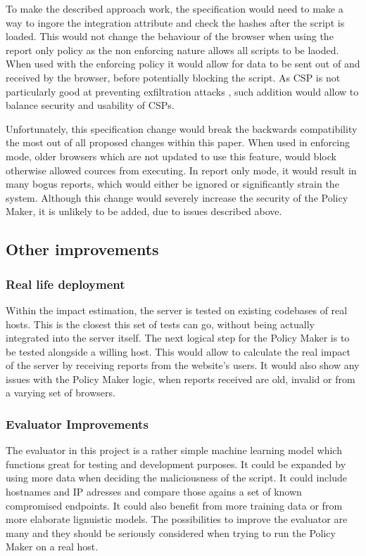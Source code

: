 \begin{description}
To make the described approach work, the specification would need to make a way to ingore the integration attribute and check the hashes after the script is loaded.
This would not change the behaviour of the browser when using the report only policy as the non enforcing nature allows all scripts to be laoded.
When used with the enforcing policy it would allow for data to be sent out of and received by the browser, before potentially blocking the script.
As CSP is not particularly good at preventing exfiltration attacks \cite{CSPexfil}, such addition would allow to balance security and usability of CSPs.

Unfortunately, this specification change would break the backwards compatibility the most out of all proposed changes within this paper.
When used in enforcing mode, older browsers which are not updated to use this feature, would block otherwise allowed cources from executing.
In report only mode, it would result in many bogus reports, which would either be ignored or significantly strain the system.
Although this change would severely increase the security of the Policy Maker, it is unlikely to be added, due to issues described above.

\subsection{Other improvements}

\subsubsection{Real life deployment}

Within the impact estimation, the server is tested on existing codebases of real hosts.
This is the closest this set of tests can go, without being actually integrated into the server itself.
The next logical step for the Policy Maker is to be tested alongside a willing host.
This would allow to calculate the real impact of the server by receiving reports from the website's users.
It would also show any issues with the Policy Maker logic, when reports received are old, invalid or from a varying set of browsers.

\subsubsection{Evaluator Improvements}

The evaluator in this project is a rather simple machine learning model which functions great for testing and development purposes.
It could be expanded by using more data when deciding the maliciousness of the script.
It could include hostnames and IP adresses and compare those agains a set of known compromised endpoints.
It could also benefit from more training data or from more elaborate lignuistic models.
The possibilities to improve the evaluator are many and they should be seriously considered when trying to run the Policy Maker on a real host.


\end{description}
